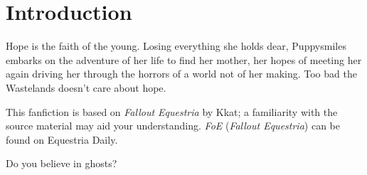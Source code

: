 \chapter{Introduction}

Hope is the faith of the young. Losing everything she holds dear, Puppysmiles embarks on the adventure of her life to find her mother, her hopes of meeting her again driving her through the horrors of a world not of her making. Too bad the Wastelands doesn't care about hope.

This fanfiction is based on \emph{Fallout Equestria} by Kkat; a familiarity with the source material may aid your understanding. \emph{FoE} (\emph{Fallout Equestria}) can be found on Equestria Daily.

\clearpage

\begin{motto}
Do you believe in ghosts?
\end{motto}


